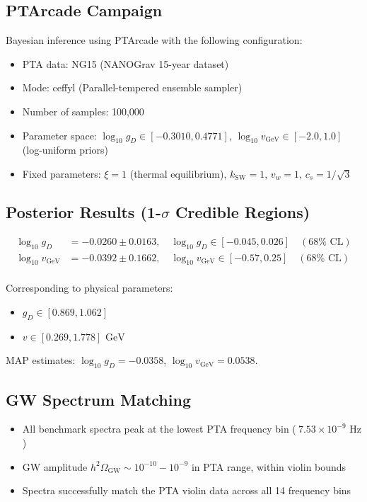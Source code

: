 \documentclass[11pt,a4paper,oneside]{article}
\begin{document}
\subsection{PTArcade Campaign}
Bayesian inference using PTArcade with the following configuration:
\begin{itemize}
\item PTA data: NG15 (NANOGrav 15-year dataset)
\item Mode: ceffyl (Parallel-tempered ensemble sampler)
\item Number of samples: 100,000
\item Parameter space: $\log_{10} g_D \in [-0.3010, 0.4771]$, $\log_{10} v_{\text{GeV}} \in [-2.0, 1.0]$ (log-uniform priors)
\item Fixed parameters: $\xi = 1$ (thermal equilibrium), $k_{\text{SW}} = 1$, $v_w = 1$, $c_s = 1/\sqrt{3}$
\end{itemize}

\subsection{Posterior Results (1-$\sigma$ Credible Regions)}
\begin{equation*}
\begin{aligned}
\log_{10} g_D &= -0.0260 \pm 0.0163, \quad \log_{10} g_D \in [-0.045, 0.026] \quad (68\% \text{ CL}) \\ 
\log_{10} v_{\text{GeV}} &= -0.0392 \pm 0.1662, \quad \log_{10} v_{\text{GeV}} \in [-0.57, 0.25] \quad (68\% \text{ CL}) \\
\end{aligned}
\end{equation*}

Corresponding to physical parameters:
\begin{itemize}
\item $g_D \in [0.869, 1.062]$
\item $v \in [0.269, 1.778] \text{ GeV}$
\end{itemize}

MAP estimates: $\log_{10} g_D = -0.0358$, $\log_{10} v_{\text{GeV}} = 0.0538$.

\subsection{GW Spectrum Matching}
\begin{itemize}
\item All benchmark spectra peak at the lowest PTA frequency bin ($~7.53 \times 10^{-9} \text{ Hz}$)
\item GW amplitude $h^2 \Omega_{\text{GW}} \sim 10^{-10} {-} 10^{-9}$ in PTA range, within violin bounds
\item Spectra successfully match the PTA violin data across all 14 frequency bins
\end{itemize}
\end{document}
